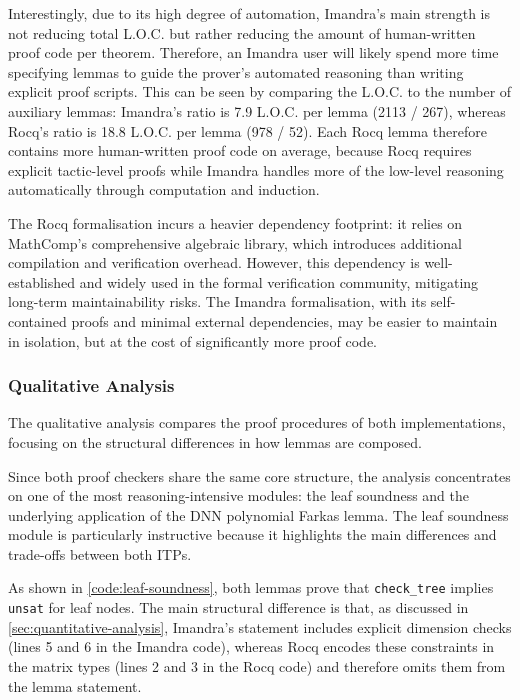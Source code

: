 Interestingly, due to its high degree of automation, Imandra's main strength is not reducing total L.O.C. but rather reducing the amount of human-written proof code per theorem. Therefore, an Imandra user will likely spend more time specifying lemmas to guide the prover's automated reasoning than writing explicit proof scripts. This can be seen by comparing the L.O.C. to the number of auxiliary lemmas: Imandra's ratio is 7.9 L.O.C. per lemma (2113 / 267), whereas Rocq's ratio is 18.8 L.O.C. per lemma (978 / 52). Each Rocq lemma therefore contains more human-written proof code on average, because Rocq requires explicit tactic-level proofs while Imandra handles more of the low-level reasoning automatically through computation and induction.

The Rocq formalisation incurs a heavier dependency footprint: it relies on MathComp's comprehensive algebraic library, which introduces additional compilation and verification overhead. However, this dependency is well-established and widely used in the formal verification community, mitigating long-term maintainability risks. The Imandra formalisation, with its self-contained proofs and minimal external dependencies, may be easier to maintain in isolation, but at the cost of significantly more proof code.

\subsubsection{Qualitative Analysis}

The qualitative analysis compares the proof procedures of both implementations, focusing on the structural differences in how lemmas are composed.

Since both proof checkers share the same core structure, the analysis concentrates on one of the most reasoning-intensive modules: the leaf soundness and the underlying application of the DNN polynomial Farkas lemma. The leaf soundness module is particularly instructive because it highlights the main differences and trade-offs between both ITPs.

As shown in \autoref{code:leaf-soundness}, both lemmas prove that \texttt{check\_tree} implies \texttt{unsat} for leaf nodes. The main structural difference is that, as discussed in \autoref{sec:quantitative-analysis}, Imandra's statement includes explicit dimension checks (lines 5 and 6 in the Imandra code), whereas Rocq encodes these constraints in the matrix types (lines 2 and 3 in the Rocq code) and therefore omits them from the lemma statement.

